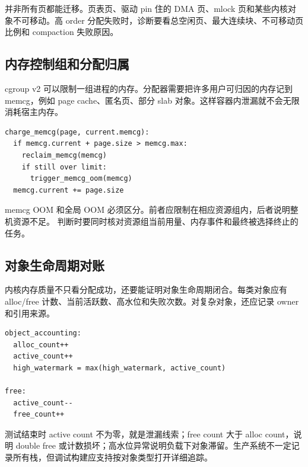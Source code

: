 并非所有页都能迁移。页表页、驱动 pin 住的 DMA 页、mlock 页和某些内核对象不可移动。高 order 分配失败时，诊断要看总空闲页、最大连续块、不可移动页比例和 compaction 失败原因。

\subsection{内存控制组和分配归属}

cgroup v2 可以限制一组进程的内存。分配器需要把许多用户可归因的内存记到 memcg，例如 page cache、匿名页、部分 slab 对象。这样容器内泄漏就不会无限消耗宿主内存。

\begin{lstlisting}
charge_memcg(page, current.memcg):
  if memcg.current + page.size > memcg.max:
    reclaim_memcg(memcg)
    if still over limit:
      trigger_memcg_oom(memcg)
  memcg.current += page.size
\end{lstlisting}

memcg OOM 和全局 OOM 必须区分。前者应限制在相应资源组内，后者说明整机资源不足。
判断时要同时核对资源组当前用量、内存事件和最终被选择终止的任务。

\subsection{对象生命周期对账}

内核内存质量不只看分配成功，还要能证明对象生命周期闭合。每类对象应有 alloc/free 计数、当前活跃数、高水位和失败次数。对复杂对象，还应记录 owner 和引用来源。

\begin{lstlisting}
object_accounting:
  alloc_count++
  active_count++
  high_watermark = max(high_watermark, active_count)

free:
  active_count--
  free_count++
\end{lstlisting}

测试结束时 active count 不为零，就是泄漏线索；free count 大于 alloc count，说明 double free 或计数损坏；高水位异常说明负载下对象滞留。生产系统不一定记录所有栈，但调试构建应支持按对象类型打开详细追踪。
